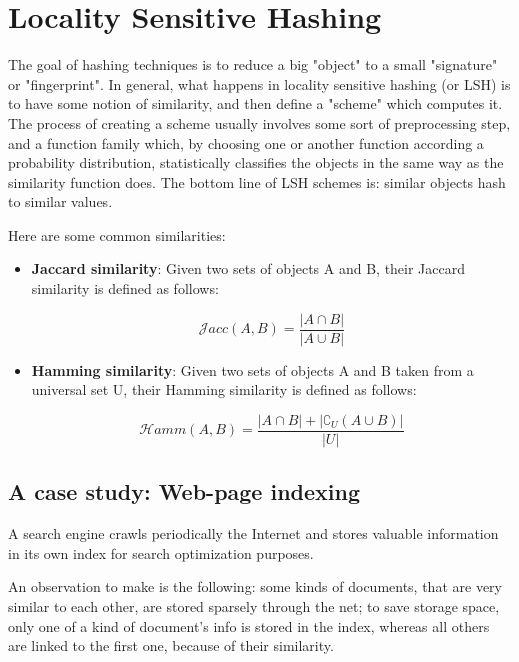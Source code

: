 \documentclass{report}
\newcommand{\jaccsim}{\mathcal{J}acc}
\newcommand{\hammsim}{\mathcal{H}amm}
\begin{document}
\chapter{Locality Sensitive Hashing}
	
	The goal of hashing techniques is to reduce a big "object" to a small "signature" or "fingerprint". In general, what happens in locality sensitive hashing (or LSH) is to have some notion of similarity, and then define a "scheme" which computes it. The process of creating a scheme usually involves some sort of preprocessing step, and a function family which, by choosing one or another function according a probability distribution, statistically classifies the objects in the same way as the similarity function does.
	The bottom line of LSH schemes is: similar objects hash to similar values.
	
	Here are some common similarities:
	\begin{itemize}
	
\item \textbf{Jaccard similarity}: Given two sets of objects A and B, their Jaccard similarity is defined as follows:
	
	\begin{equation}
	\jaccsim(A, B) = \frac{|A\cap B|}{|A\cup B|}
	\end{equation}
	
\item \textbf{Hamming similarity}: Given two sets of objects A and B taken from a universal set U, their Hamming similarity is defined as follows:
	
	\begin{equation}
	\hammsim(A, B) = \frac{|A\cap B| + |\complement_U(A\cup B)|}{|U|}
	\end{equation}
	
	\end{itemize}
	
\section{A case study: Web-page indexing}
	
	A search engine crawls periodically the Internet and stores valuable information in its own index for search optimization purposes.
	
	An observation to make is the following: some kinds of documents, that are very similar to each other, are stored sparsely through the net; to save storage space, only one of a kind of document's info is stored in the index, whereas all others are linked to the first one, because of their similarity.
	
\end{document}
